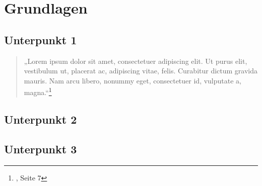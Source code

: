 \section{Grundlagen}
\label{sec:grundlagen}

\subsection{Unterpunkt 1}

\begin{quote}{„Lorem ipsum dolor sit amet, consectetuer adipiscing elit. Ut purus elit, vestibulum
ut, placerat ac, adipiscing vitae, felis. Curabitur dictum gravida mauris. Nam arcu
libero, nonummy eget, consectetuer id, vulputate a, magna.“\footnote{\cite{bd25}, Seite 7}}
\end{quote}

\lipsum[13-14]

\subsection{Unterpunkt 2}
\lipsum[15]

\subsection{Unterpunkt 3}
\lipsum[16]

